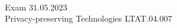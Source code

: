 
\thispagestyle{empty}
\begin{center}

\large
{\thesisUniversity}\\
{\thesisInstitute}\\
{\thesisDepartment}\\

\vspace{45mm}

\Large {\thesisAuthor}

\vspace{4mm}
\large

\huge{Exam 31.05.2023} \\
\vspace{4mm}
\Large {Privacy-preserving Technologies LTAT.04.007}


\vspace{20mm}


\end{center}

\vspace{2mm}

\begin{flushright}
 {
 \setlength{\extrarowheight}{5pt}
 \begin{tabular}{r l} 
 \end{tabular}
 }
\end{flushright}


\vfill
\centerline{\large {\thesisCity} {\thesisYear}}

